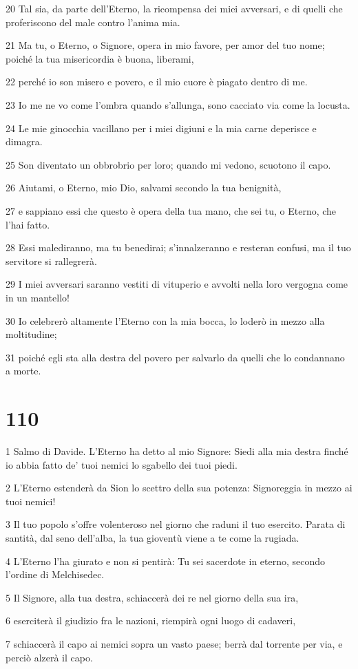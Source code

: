 \par 20 Tal sia, da parte dell'Eterno, la ricompensa dei miei avversari, e di quelli che proferiscono del male contro l'anima mia.
\par 21 Ma tu, o Eterno, o Signore, opera in mio favore, per amor del tuo nome; poiché la tua misericordia è buona, liberami,
\par 22 perché io son misero e povero, e il mio cuore è piagato dentro di me.
\par 23 Io me ne vo come l'ombra quando s'allunga, sono cacciato via come la locusta.
\par 24 Le mie ginocchia vacillano per i miei digiuni e la mia carne deperisce e dimagra.
\par 25 Son diventato un obbrobrio per loro; quando mi vedono, scuotono il capo.
\par 26 Aiutami, o Eterno, mio Dio, salvami secondo la tua benignità,
\par 27 e sappiano essi che questo è opera della tua mano, che sei tu, o Eterno, che l'hai fatto.
\par 28 Essi malediranno, ma tu benedirai; s'innalzeranno e resteran confusi, ma il tuo servitore si rallegrerà.
\par 29 I miei avversari saranno vestiti di vituperio e avvolti nella loro vergogna come in un mantello!
\par 30 Io celebrerò altamente l'Eterno con la mia bocca, lo loderò in mezzo alla moltitudine;
\par 31 poiché egli sta alla destra del povero per salvarlo da quelli che lo condannano a morte.

\chapter{110}

\par 1 Salmo di Davide. L'Eterno ha detto al mio Signore: Siedi alla mia destra finché io abbia fatto de' tuoi nemici lo sgabello dei tuoi piedi.
\par 2 L'Eterno estenderà da Sion lo scettro della sua potenza: Signoreggia in mezzo ai tuoi nemici!
\par 3 Il tuo popolo s'offre volenteroso nel giorno che raduni il tuo esercito. Parata di santità, dal seno dell'alba, la tua gioventù viene a te come la rugiada.
\par 4 L'Eterno l'ha giurato e non si pentirà: Tu sei sacerdote in eterno, secondo l'ordine di Melchisedec.
\par 5 Il Signore, alla tua destra, schiaccerà dei re nel giorno della sua ira,
\par 6 eserciterà il giudizio fra le nazioni, riempirà ogni luogo di cadaveri,
\par 7 schiaccerà il capo ai nemici sopra un vasto paese; berrà dal torrente per via, e perciò alzerà il capo.

